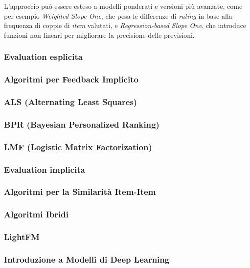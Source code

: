 L'approccio può essere esteso a modelli ponderati e versioni più avanzate, come per esempio \emph{Weighted Slope One}, che pesa le differenze di \textit{rating} in base alla frequenza di coppie di \textit{item} valutati, e \emph{Regression-based Slope One}, che introduce funzioni non lineari per migliorare la precisione delle previsioni.

\subsubsection{Evaluation esplicita}\label{evaluation-esplicita}

\subsubsection{Algoritmi per Feedback Implicito}\label{algoritmi-per-feedback-implicito}

\subsubsection{ALS (Alternating Least Squares)}\label{als-alternating-least-squares}

\subsubsection{BPR (Bayesian Personalized Ranking)}\label{bpr-bayesian-personalized-ranking}

\subsubsection{LMF (Logistic Matrix Factorization)}\label{lmf-logistic-matrix-factorization}

\subsubsection{Evaluation implicita}\label{evaluation-implicita}

\subsubsection{Algoritmi per la Similarità Item-Item}\label{algoritmi-per-la-similarita-item-item}

\subsubsection{Algoritmi Ibridi}\label{algoritmi-ibridi}

\subsubsection{LightFM}\label{lightfm}

\subsubsection{Introduzione a Modelli di Deep Learning}\label{introduzione-a-modelli-di-deep-learning}

